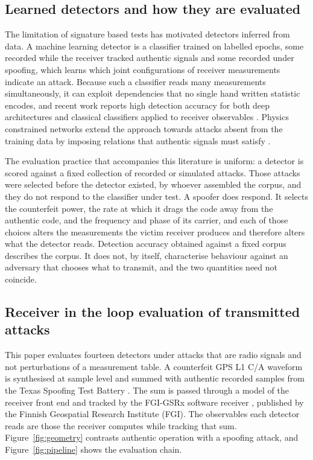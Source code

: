 \documentclass[pdflatex,sn-basic]{sn-jnl}
\theoremstyle{thmstyleone}
\theoremstyle{thmstyletwo}
\theoremstyle{thmstylethree}
\begin{document}
\subsection{Learned detectors and how they are evaluated}

The limitation of signature based tests has motivated detectors inferred from data. A
machine learning detector is a classifier trained on labelled epochs, some recorded while
the receiver tracked authentic signals and some recorded under spoofing, which learns which
joint configurations of receiver measurements indicate an attack. Because such a classifier
reads many measurements simultaneously, it can exploit dependencies that no single hand
written statistic encodes, and recent work reports high detection accuracy for both deep
architectures and classical classifiers applied to receiver observables
\citep{borhanidarian2024deep,li2025realtime,chen2025cgan}. Physics constrained networks
extend the approach towards attacks absent from the training data by imposing relations that
authentic signals must satisfy \citep{song2026generalized}.

The evaluation practice that accompanies this literature is uniform: a detector is scored
against a fixed collection of recorded or simulated attacks. Those attacks were selected
before the detector existed, by whoever assembled the corpus, and they do not respond to the
classifier under test. A spoofer does respond. It selects the counterfeit power, the rate at
which it drags the code away from the authentic code, and the frequency and phase of its
carrier, and each of those choices alters the measurements the victim receiver produces and
therefore alters what the detector reads. Detection accuracy obtained against a fixed corpus
describes the corpus. It does not, by itself, characterise behaviour against an adversary
that chooses what to transmit, and the two quantities need not coincide.

\subsection{Receiver in the loop evaluation of transmitted attacks}

This paper evaluates fourteen detectors under attacks that are radio signals and not
perturbations of a measurement table. A counterfeit GPS L1 C/A waveform is synthesised at
sample level and summed with authentic recorded samples from the Texas Spoofing Test Battery
\citep{humphreys2012texbat,humphreys2016texbatds78}. The sum is passed through a model of the
receiver front end and tracked by the FGI-GSRx software receiver \citep{fgigsrx}, published by the
Finnish Geospatial Research Institute (FGI). The observables
each detector reads are those the receiver computes while tracking that sum.
Figure~\ref{fig:geometry} contrasts authentic operation with a spoofing attack, and
Figure~\ref{fig:pipeline} shows the evaluation chain.
\end{document}
